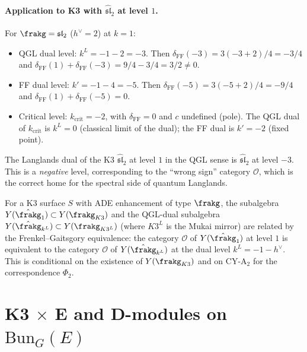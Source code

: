 \paragraph{Application to K3 with \texorpdfstring{$\hat{\mathfrak{sl}}_2$}{hatsl-2} at level \texorpdfstring{$1$}{1}.}
For $\frakg = \mathfrak{sl}_2$ ($h^\vee = 2$) at $k = 1$:
\begin{itemize}
 \item QGL dual level: $k^L = -1 - 2 = -3$. Then $\delta_{\mathrm{FF}}(-3) = 3(-3 + 2)/4 = -3/4$ and $\delta_{\mathrm{FF}}(1) + \delta_{\mathrm{FF}}(-3) = 9/4 - 3/4 = 3/2 \neq 0$.
 \item FF dual level: $k' = -1 - 4 = -5$. Then $\delta_{\mathrm{FF}}(-5) = 3(-5 + 2)/4 = -9/4$ and $\delta_{\mathrm{FF}}(1) + \delta_{\mathrm{FF}}(-5) = 0$.
 \item Critical level: $k_{\mathrm{crit}} = -2$, with $\delta_{\mathrm{FF}} = 0$ and $c$ undefined (pole). The QGL dual of $k_{\mathrm{crit}}$ is $k^L = 0$ (classical limit of the dual); the FF dual is $k' = -2$ (fixed point).
\end{itemize}
The Langlands dual of the K3 $\hat{\mathfrak{sl}}_2$ at level $1$ in the QGL sense is $\hat{\mathfrak{sl}}_2$ at level $-3$. This is a \emph{negative} level, corresponding to the ``wrong sign'' category $\mathcal{O}$, which is the correct home for the spectral side of quantum Langlands.

\begin{conjecture}
\label{conj:k3-yangian-qgl}
\ClaimStatusConjectured
For a K3 surface $S$ with ADE enhancement of type $\frakg$, the subalgebra $Y(\hat{\frakg}_1) \subset Y(\frakg_{K3})$ and the QGL-dual subalgebra $Y(\hat{\frakg}_{k^L}) \subset Y(\frakg_{K3^L})$ (where $K3^L$ is the Mukai mirror) are related by the Frenkel--Gaitsgory equivalence: the category $\mathcal{O}$ of $Y(\hat{\frakg}_1)$ at level $1$ is equivalent to the category $\mathcal{O}$ of $Y(\hat{\frakg}_{k^L})$ at the dual level $k^L = -1 - h^\vee$. This is conditional on the existence of $Y(\frakg_{K3})$ and on CY-A$_2$ for the correspondence $\Phi_2$.
\end{conjecture}


\section{K3 \texorpdfstring{$\times$}{x} E and D-modules on \texorpdfstring{$\mathrm{Bun}_G(E)$}{Bun-G(E)}}
\label{sec:k3xe-dmodules}

